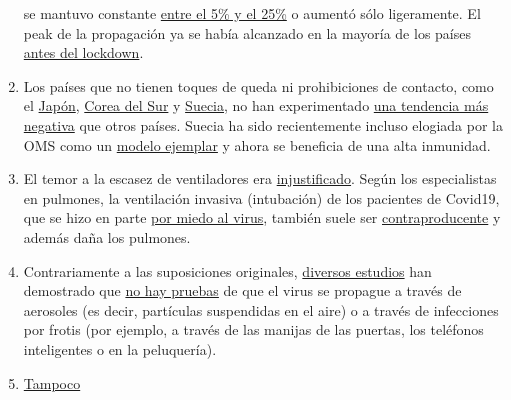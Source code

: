 \begin{enumerate}
  se mantuvo constante
  \href{https://swprs.org/rate-of-positive-covid19-tests/}{entre el 5\%
  y el 25\%} o aumentó sólo ligeramente. El peak de la propagación ya se
  había alcanzado en la mayoría de los países
  \href{https://infekt.ch/2020/04/sind-wir-tatsaechlich-im-blindflug/}{antes
  del lockdown}.
\item
  Los países que no tienen toques de queda ni prohibiciones de contacto,
  como el
  \href{https://www.japantimes.co.jp/news/2020/03/20/national/coronavirus-explosion-expected-japan/\#.XrW73agzaUk}{Japón},
  \href{https://www.businessinsider.com/south-korea-coronavirus-testing-death-rate-2020-3?op=1}{Corea
  del Sur} y
  \href{https://www.washingtontimes.com/news/2020/apr/15/sweden-coronavirus-rates-easing-despite-loose-rule/}{Suecia},
  no han experimentado
  \href{https://www.addendum.org/coronavirus/interview-johan-giesecke/}{una
  tendencia más negativa} que otros países. Suecia ha sido recientemente
  incluso elogiada por la OMS como un
  \href{https://nypost.com/2020/04/29/who-lauds-sweden-as-model-for-resisting-coronavirus-lockdown/}{modelo
  ejemplar} y ahora se beneficia de una alta inmunidad.
\item
  El temor a la escasez de ventiladores era
  \href{https://off-guardian.org/2020/05/06/covid19-are-ventilators-killing-people/}{injustificado}.
  Según los especialistas en pulmones, la ventilación invasiva
  (intubación) de los pacientes de Covid19, que se hizo en parte
  \href{https://www.dailymail.co.uk/news/article-8262351/Nurse-New-York-claims-city-killing-COVID-19-patients-putting-ventilators.html}{por
  miedo al virus}, también suele ser
  \href{https://off-guardian.org/2020/05/06/covid19-are-ventilators-killing-people/}{contraproducente}
  y además daña los pulmones.
\item
  Contrariamente a las suposiciones originales,
  \href{https://www.who.int/news-room/commentaries/detail/modes-of-transmission-of-virus-causing-covid-19-implications-for-ipc-precaution-recommendations}{diversos
  estudios} han demostrado que
  \href{https://www.telegraph.co.uk/news/2020/04/02/no-proof-coronavirus-can-spread-shopping-says-leading-german/}{no
  hay pruebas} de que el virus se propague a través de aerosoles (es
  decir, partículas suspendidas en el aire) o a través de infecciones
  por frotis (por ejemplo, a través de las manijas de las puertas, los
  teléfonos inteligentes o en la peluquería).
\item
  \href{https://www.researchgate.net/publication/340570735_Masks_Don't_Work_A_review_of_science_relevant_to_COVID-19_social_policy}{Tampoco
}
\end{enumerate}

